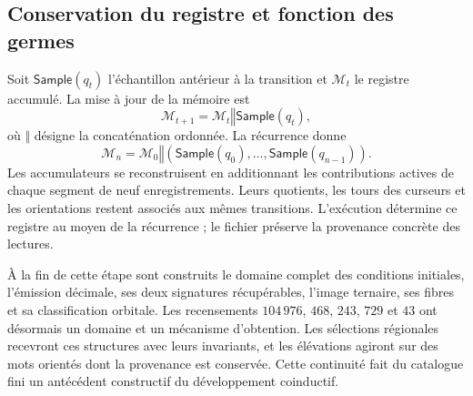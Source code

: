 \subsection{Conservation du registre et fonction des germes}
\label{act21:tpk:conclusion}

Soit \(\mathsf{Sample}(q_t)\) l'échantillon antérieur à la transition et \(\mathcal M_t\) le registre accumulé. La mise à jour de la mémoire est
\begin{equation}
 \mathcal M_{t+1}=\mathcal M_t\mathbin{\Vert}\mathsf{Sample}(q_t),
 \label{act21:tpk:archivo}
\end{equation}
où \(\Vert\) désigne la concaténation ordonnée. La récurrence donne
\[
 \mathcal M_n=\mathcal M_0\mathbin{\Vert}
 (\mathsf{Sample}(q_0),\ldots,\mathsf{Sample}(q_{n-1})).
\]
Les accumulateurs se reconstruisent en additionnant les contributions actives de
chaque segment de neuf enregistrements. Leurs quotients, les tours des
curseurs et les orientations restent associés aux mêmes transitions.
L'exécution détermine ce registre au moyen de la récurrence ; le fichier
préserve la provenance concrète des lectures.



\pagebreak %


À la fin de cette étape sont construits le domaine complet des conditions
initiales, l'émission décimale, ses deux signatures récupérables, l'image ternaire,
ses fibres et sa classification orbitale. Les recensements \(104\,976\), \(468\),
\(243\), \(729\) et \(43\) ont désormais un domaine et un mécanisme d'obtention.
Les sélections régionales recevront ces structures avec leurs invariants,
et les élévations agiront sur des mots orientés dont la provenance est
conservée. Cette continuité fait du catalogue fini un antécédent
constructif du développement coinductif.
